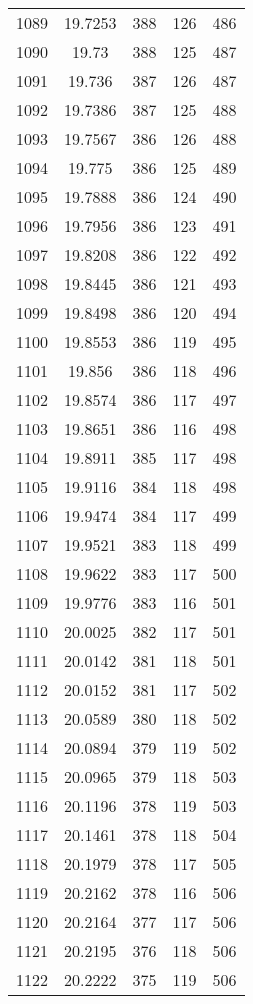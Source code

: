 \documentclass[12pt,a4paper]{article}
\begin{document}
\begin{tabular}{r|cccc}
	1089 & 19.7253 & 388 & 126 & 486 \\
	1090 & 19.73 & 388 & 125 & 487 \\
	1091 & 19.736 & 387 & 126 & 487 \\
	1092 & 19.7386 & 387 & 125 & 488 \\
	1093 & 19.7567 & 386 & 126 & 488 \\
	1094 & 19.775 & 386 & 125 & 489 \\
	1095 & 19.7888 & 386 & 124 & 490 \\
	1096 & 19.7956 & 386 & 123 & 491 \\
	1097 & 19.8208 & 386 & 122 & 492 \\
	1098 & 19.8445 & 386 & 121 & 493 \\
	1099 & 19.8498 & 386 & 120 & 494 \\
	1100 & 19.8553 & 386 & 119 & 495 \\
	1101 & 19.856 & 386 & 118 & 496 \\
	1102 & 19.8574 & 386 & 117 & 497 \\
	1103 & 19.8651 & 386 & 116 & 498 \\
	1104 & 19.8911 & 385 & 117 & 498 \\
	1105 & 19.9116 & 384 & 118 & 498 \\
	1106 & 19.9474 & 384 & 117 & 499 \\
	1107 & 19.9521 & 383 & 118 & 499 \\
	1108 & 19.9622 & 383 & 117 & 500 \\
	1109 & 19.9776 & 383 & 116 & 501 \\
	1110 & 20.0025 & 382 & 117 & 501 \\
	1111 & 20.0142 & 381 & 118 & 501 \\
	1112 & 20.0152 & 381 & 117 & 502 \\
	1113 & 20.0589 & 380 & 118 & 502 \\
	1114 & 20.0894 & 379 & 119 & 502 \\
	1115 & 20.0965 & 379 & 118 & 503 \\
	1116 & 20.1196 & 378 & 119 & 503 \\
	1117 & 20.1461 & 378 & 118 & 504 \\
	1118 & 20.1979 & 378 & 117 & 505 \\
	1119 & 20.2162 & 378 & 116 & 506 \\
	1120 & 20.2164 & 377 & 117 & 506 \\
	1121 & 20.2195 & 376 & 118 & 506 \\
	1122 & 20.2222 & 375 & 119 & 506 \\

\end{tabular}
\end{document}
